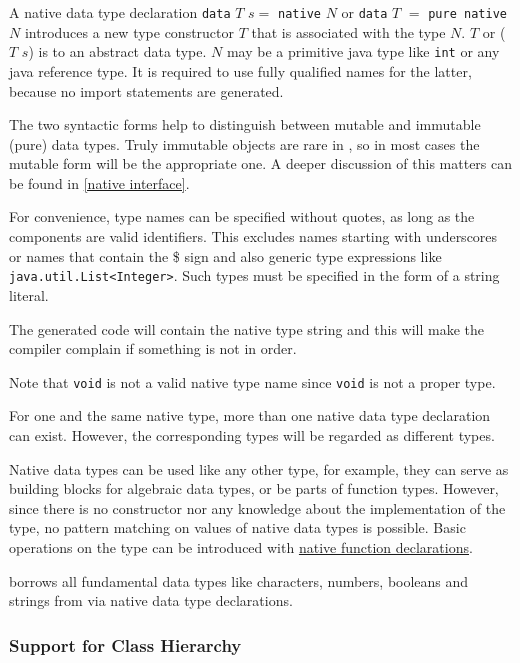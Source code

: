 A native data type declaration \texttt{data} $T$ $s =$ \texttt{native} $N$ or \texttt{data} $T$ $=$ \texttt{pure native} $N$ introduces a new type constructor $T$ that is associated with the \java{} type $N$. $T$ or ($T$ $s$) is to \frege{} an abstract data type. $N$ may be a primitive java type like \texttt{int} or any java reference type. It is required to use fully qualified \java{} names for the latter, because no \java{} import statements are generated.

The two syntactic forms help to distinguish between mutable and immutable (pure) data types. Truly immutable objects are rare in \java{}, so in most cases the mutable form will be the appropriate one. A deeper discussion of this matters can be found in \autoref{native interface}.

For convenience, \java{} type names can be specified without quotes, as long as the components are valid \frege{} identifiers. This excludes names starting with underscores or names that contain the \$ sign and also \java{} generic type expressions like \texttt{java.util.List<Integer>}. Such \java{} types must be specified in the form of a string literal.

The generated code will contain the native type string and this will make the \java{} compiler complain if something is not in order.

Note that \texttt{void} is not a valid native type name since \texttt{void} is not a proper type.

For one and the same native type, more than one native data type declaration can exist. However, the corresponding \frege{} types will be regarded as different types.

Native data types can be used like any other type, for example, they can serve as building blocks for algebraic data types, or be parts of function types. However, since there is no constructor nor any knowledge about the implementation of the type, no pattern matching on values of native data types is possible. Basic operations on the type can be introduced with \hyperref[nativefun]{native function declarations}.

\frege{} borrows all fundamental data types like characters, numbers, booleans and strings from \java{} via native data type declarations. 

\subsubsection{Support for \java{} Class Hierarchy}

